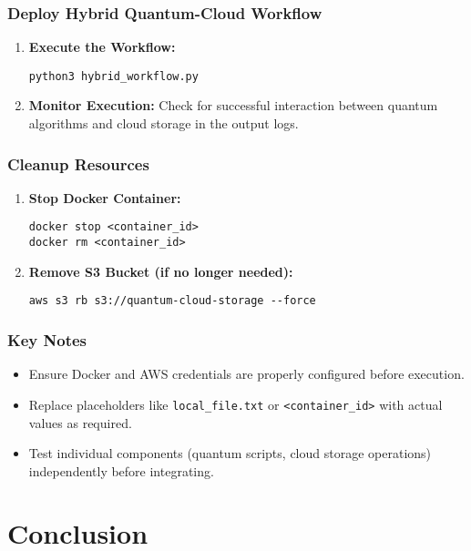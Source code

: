 \documentclass[12pt,a4paper]{article}
\begin{document}
\subsubsection{Deploy Hybrid Quantum-Cloud Workflow}

\begin{enumerate}
    \item \textbf{Execute the Workflow:}
    \begin{verbatim}
python3 hybrid_workflow.py
    \end{verbatim}

    \item \textbf{Monitor Execution:}
    Check for successful interaction between quantum algorithms and cloud storage in the output logs.
\end{enumerate}

\subsubsection{Cleanup Resources}

\begin{enumerate}
    \item \textbf{Stop Docker Container:}
    \begin{verbatim}
docker stop <container_id>
docker rm <container_id>
    \end{verbatim}

    \item \textbf{Remove S3 Bucket (if no longer needed):}
    \begin{verbatim}
aws s3 rb s3://quantum-cloud-storage --force
    \end{verbatim}
\end{enumerate}

\subsubsection{Key Notes}
\begin{itemize}
    \item Ensure Docker and AWS credentials are properly configured before execution.
    \item Replace placeholders like \texttt{local\_file.txt} or \texttt{<container\_id>} with actual values as required.
    \item Test individual components (quantum scripts, cloud storage operations) independently before integrating.
\end{itemize}

\begin{center}
    \fontsize{14}{16}\selectfont \bfseries
    \section{Conclusion}
\end{center}
\end{document}
